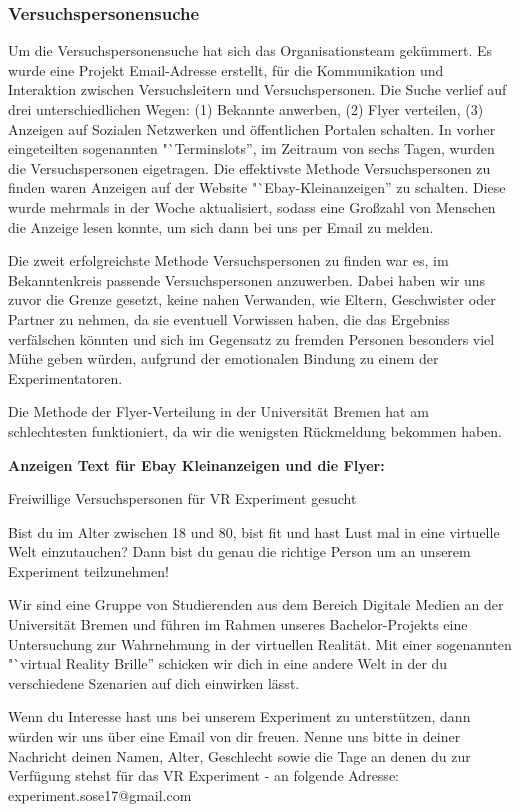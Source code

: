 \documentclass{Bericht}
\begin{document}
\subsubsection{Versuchspersonensuche}
Um die Versuchspersonensuche hat sich das Organisationsteam gekümmert. Es wurde eine Projekt Email-Adresse erstellt, für die Kommunikation und Interaktion zwischen Versuchsleitern und Versuchspersonen. Die Suche verlief auf drei unterschiedlichen Wegen: (1) Bekannte anwerben, (2) Flyer verteilen, (3) Anzeigen auf Sozialen Netzwerken und öffentlichen Portalen schalten. In vorher eingeteilten sogenannten "`Terminslots'', im Zeitraum von sechs Tagen, wurden die Versuchspersonen eigetragen. Die effektivste Methode Versuchspersonen zu finden waren Anzeigen auf der Website "`Ebay-Kleinanzeigen'' zu schalten. Diese wurde mehrmals in der Woche aktualisiert, sodass eine Großzahl von Menschen die Anzeige lesen konnte, um sich dann bei uns per Email zu melden.

Die zweit erfolgreichste Methode Versuchspersonen zu finden war es, im Bekanntenkreis passende Versuchspersonen anzuwerben. Dabei haben wir uns zuvor die Grenze gesetzt, keine nahen Verwanden, wie Eltern, Geschwister oder Partner zu nehmen, da sie eventuell Vorwissen haben, die das Ergebniss verfälschen könnten und sich im Gegensatz zu fremden Personen besonders viel Mühe geben würden, aufgrund der emotionalen Bindung zu einem der Experimentatoren. 

Die Methode der Flyer-Verteilung in der Universität Bremen hat am schlechtesten funktioniert, da wir die wenigsten Rückmeldung bekommen haben.

\textbf{Anzeigen Text für Ebay Kleinanzeigen und die Flyer:}

Freiwillige Versuchspersonen für VR Experiment gesucht

Bist du im Alter zwischen 18 und 80, bist fit und hast Lust mal in eine virtuelle Welt einzutauchen? Dann bist du genau die richtige Person um an unserem Experiment teilzunehmen!

Wir sind eine Gruppe von Studierenden aus dem Bereich Digitale Medien an der Universität Bremen und führen im Rahmen unseres Bachelor-Projekts eine Untersuchung zur Wahrnehmung in der virtuellen Realität. Mit einer sogenannten "`virtual Reality Brille'' schicken wir dich in eine andere Welt in der du verschiedene Szenarien auf dich einwirken lässt.

Wenn du Interesse hast uns bei unserem Experiment zu unterstützen, dann würden wir uns über eine Email von dir freuen. Nenne uns bitte in deiner Nachricht deinen Namen, Alter, Geschlecht sowie die Tage an denen du zur Verfügung stehst für das VR Experiment - an folgende Adresse: experiment.sose17@gmail.com \\
\end{document}
